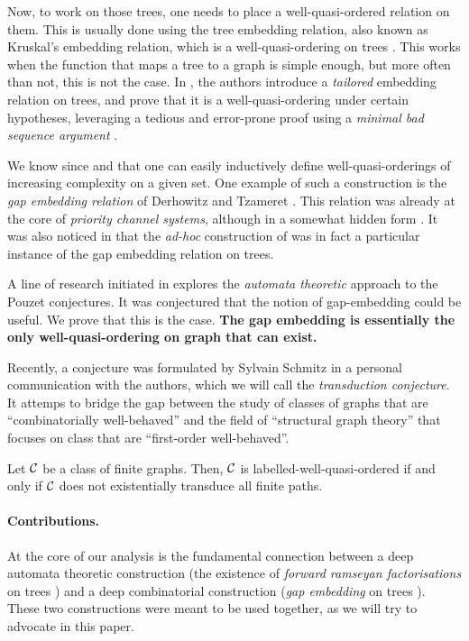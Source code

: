 Now, to work on those trees, one needs to place a well-quasi-ordered relation
on them. This is usually done using the tree embedding relation, also known as
Kruskal's embedding relation, which is a well-quasi-ordering on trees
\cite{KRU72}. This works when the function that maps a tree to a graph is
simple enough, but more often than not, this is not the case. In \cite{DRT10},
the authors introduce a \emph{tailored} embedding relation on trees, and prove
that it is a well-quasi-ordering under certain hypotheses, leveraging a tedious
and error-prone proof using a \emph{minimal bad sequence argument}
\cite{NASH65}. 

We know since \cite{FREU20} and \cite{LOPEZ23} that one can easily inductively
define well-quasi-orderings of increasing complexity on a given set. One
example of such a construction is the \emph{gap embedding relation} of
Derhowitz and Tzameret \cite{DERSHOWITZ200380}. This relation was already at
the core of \emph{priority channel systems}, although in a somewhat hidden form
\cite{HSS13}.  It was also noticed in \cite{LOPEZ24} that the \emph{ad-hoc}
construction of \cite{DRT10} was in fact a particular instance of the gap
embedding relation on trees.

A line of research initiated in \cite{LOPEZ24} explores the \emph{automata
theoretic} approach to the Pouzet conjectures. It was conjectured that the
notion of gap-embedding could be useful. We prove that this is the case.
\textbf{The gap embedding is essentially the only well-quasi-ordering on 
graph that can exist.}


Recently, a conjecture was formulated by Sylvain Schmitz in a personal
communication with the authors, which we will call the \emph{transduction
conjecture}. It attemps to bridge the gap between the study of
 classes of graphs that are ``combinatorially
well-behaved'' and the field of ``structural graph theory'' that focuses on
class that are ``first-order well-behaved''.


\begin{conjecture}
    \label{transduction:conj}
    Let $\mathcal{C}$ be a class of finite graphs.
    Then, $\mathcal{C}$ is labelled-well-quasi-ordered
    if and only if
    $\mathcal{C}$
    does not existentially transduce all finite paths.
\end{conjecture}


\paragraph*{Contributions.} At the core of our analysis is the fundamental
connection between a deep automata theoretic construction (the existence of
\emph{forward ramseyan factorisations} on trees \cite{COLC07}) and a deep
combinatorial construction (\emph{gap embedding} on trees
\cite{DERSHOWITZ200380}). These two constructions were meant to be used
together, as we will try to advocate in this paper.

